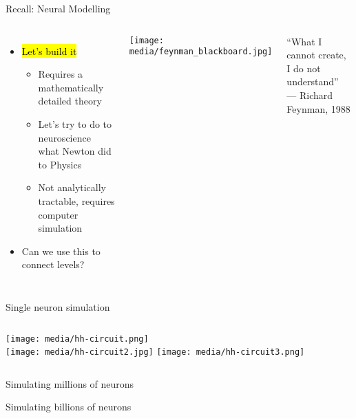 \documentclass[handout,aspectratio=169]{beamer}
\begin{document}
\begin{frame}{Recall: Neural Modelling}
	\begin{overlayarea}{\textwidth}{7cm}
		\begin{columns}[c]
			\begin{itemize}
				\setlength\itemsep{0.25cm}
				\item \hl{Let's build it}\\[0.125cm]
				\begin{itemize}
					\setlength\itemsep{0.25cm}
					\item Requires a mathematically detailed theory
					\item Let's try to do to neuroscience what Newton did to Physics
					\item Not analytically tractable, requires computer simulation
				\end{itemize}
				\item Can we use this to connect levels?
			\end{itemize}
        \centering
        \texttt{[image: media/feynman\_blackboard.jpg]}
        \begin{center}
          \color{aluminium4}
          \quotefont \enquote{What I cannot create, I do not understand} \\ --- Richard Feynman, 1988
        \end{center}
  		\end{columns}
	\end{overlayarea}
\end{frame}

\begin{frame}{Single neuron simulation}
	\centering
	\begin{columns}
		\texttt{[image: media/hh-circuit.png]}\\
		\texttt{[image: media/hh-circuit2.jpg]}
		\texttt{[image: media/hh-circuit3.png]}
	\end{columns}
\end{frame}

\begin{frame}{Simulating millions of neurons\textellipsis}
	\centering
\end{frame}

\begin{frame}{Simulating billions of neurons\textellipsis}
	\centering
\end{frame}
\end{document}
